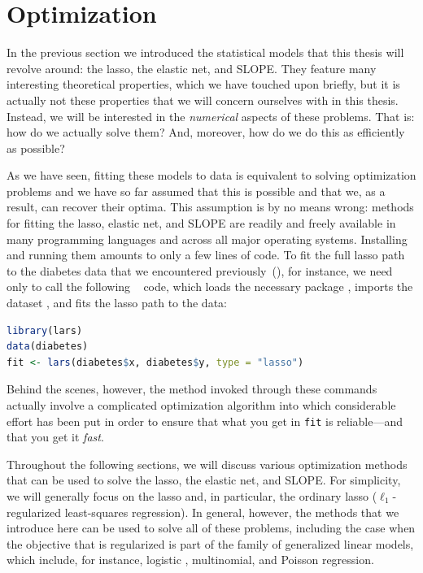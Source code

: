 \section{Optimization}\label{sec:optimization}

In the previous section we introduced the statistical models that this thesis will revolve around: the lasso, the elastic net, and SLOPE. They feature many interesting theoretical properties, which we have touched upon briefly, but it is actually not these properties that we will concern ourselves with in this thesis. Instead, we will be interested in the \emph{numerical} aspects of these problems. That is: how do we actually solve them? And, moreover, how do we do this as efficiently as possible?

As we have seen, fitting these models to data is equivalent to solving optimization problems and we have so far assumed that this is possible and that we, as a result, can recover their optima. This assumption is by no means wrong: methods for fitting the lasso, elastic net, and SLOPE are readily and freely available in many programming languages and across all major operating systems. Installing and running them amounts to only a few lines of code. To fit the full lasso path to the diabetes data that we encountered previously~(), for instance, we need only to call the following ~\parencite{rcoreteam2024} code, which loads the necessary  package , imports the dataset , and fits the lasso path to the data:

\begin{lstlisting}[language=R]
library(lars)
data(diabetes)
fit <- lars(diabetes$x, diabetes$y, type = "lasso")
\end{lstlisting}

Behind the scenes, however, the method invoked through these commands actually involve a complicated optimization algorithm into which considerable effort has been put in order to ensure that what you get in \texttt{fit} is reliable---and that you get it \emph{fast}.

Throughout the following sections, we will discuss various optimization methods that can be used to solve the lasso, the elastic net, and SLOPE. For simplicity, we will generally focus on the lasso and, in particular, the ordinary lasso (\(\ell_1\)-regularized least-squares regression). In general, however, the methods that we introduce here can be used to solve all of these problems, including the case when the objective that is regularized is part of the family of generalized linear models, which include, for instance, logistic , multinomial, and Poisson regression.

